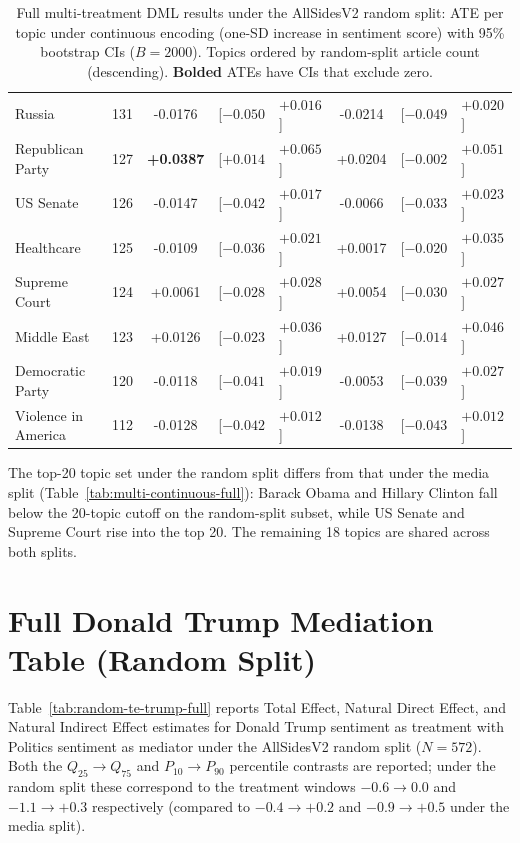\begin{table}
\begin{tabular}{l c
      S[table-format=+1.4] @{~} l @{~} l
      S[table-format=+1.4] @{~} l @{~} l}
    Russia & 131
      & -0.0176 & {[}${-0.050}$ & ${+0.016}${]}
      & -0.0214 & {[}${-0.049}$ & ${+0.020}${]} \\
    Republican Party & 127
      & \textbf{+0.0387} & {[}${+0.014}$ & ${+0.065}${]}
      & +0.0204 & {[}${-0.002}$ & ${+0.051}${]} \\
    US Senate & 126
      & -0.0147 & {[}${-0.042}$ & ${+0.017}${]}
      & -0.0066 & {[}${-0.033}$ & ${+0.023}${]} \\
    Healthcare & 125
      & -0.0109 & {[}${-0.036}$ & ${+0.021}${]}
      & +0.0017 & {[}${-0.020}$ & ${+0.035}${]} \\
    Supreme Court & 124
      & +0.0061 & {[}${-0.028}$ & ${+0.028}${]}
      & +0.0054 & {[}${-0.030}$ & ${+0.027}${]} \\
    Middle East & 123
      & +0.0126 & {[}${-0.023}$ & ${+0.036}${]}
      & +0.0127 & {[}${-0.014}$ & ${+0.046}${]} \\
    Democratic Party & 120
      & -0.0118 & {[}${-0.041}$ & ${+0.019}${]}
      & -0.0053 & {[}${-0.039}$ & ${+0.027}${]} \\
    Violence in America & 112
      & -0.0128 & {[}${-0.042}$ & ${+0.012}${]}
      & -0.0138 & {[}${-0.043}$ & ${+0.012}${]} \\
    \bottomrule
  \end{tabular}
  \caption{Full multi-treatment DML results under the AllSidesV2 random split: ATE per topic under continuous encoding (one-SD increase in sentiment score) with 95\% bootstrap CIs ($B = \num{2000}$). Topics ordered by random-split article count (descending). \textbf{Bolded} ATEs have CIs that exclude zero.}
  \label{tab:random-multi-continuous-full}
\end{table}

The top-20 topic set under the random split differs from that under the media split (Table~\ref{tab:multi-continuous-full}): Barack Obama and Hillary Clinton fall below the 20-topic cutoff on the random-split subset, while US Senate and Supreme Court rise into the top 20. The remaining 18 topics are shared across both splits.

\section{Full Donald Trump Mediation Table (Random Split)}

Table~\ref{tab:random-te-trump-full} reports Total Effect, Natural Direct Effect, and Natural Indirect Effect estimates for Donald Trump sentiment as treatment with Politics sentiment as mediator under the AllSidesV2 random split ($N = 572$). Both the $Q_{25} \to Q_{75}$ and $P_{10} \to P_{90}$ percentile contrasts are reported; under the random split these correspond to the treatment windows $-0.6 \to 0.0$ and $-1.1 \to +0.3$ respectively (compared to $-0.4 \to +0.2$ and $-0.9 \to +0.5$ under the media split).

